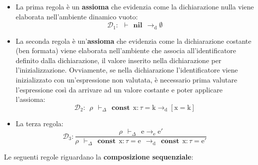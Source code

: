 \documentclass[a4paper]{article}
\begin{document}
	\begin{itemize}
		\item La prima regola è un \textbf{assioma} che evidenzia come la dichiarazione nulla viene elaborata nell'ambiente dinamico vuoto:
		\begin{equation*}
			\mathcal{D}_{1} : \:\: \vdash \:\: \mathbf{nil} \:\: \rightarrow_{\mathrm{d}} \emptyset
		\end{equation*}
	
		\item La seconda regola è un'\textbf{assioma} che evidenzia come la dichiarazione costante (ben formata) viene elaborata nell'ambiente che associa all'identificatore definito dalla dichiarazione, il valore inserito nella dichiarazione per l'inizializzazione.\newline
		Ovviamente, se nella dichiarazione l'identificatore viene inizializzato con un'espressione non valutata, è necessario prima valutare l'espressione così da arrivare ad un valore costante e poter applicare l'assioma:
		\begin{equation*}
			\mathcal{D}_{2}: \:\: \rho \:\: \vdash_{\Delta} \:\: \mathbf{const} \:\: \mathrm{x} : \tau = \mathrm{k} \rightarrow_{\mathrm{d}} \left[\mathrm{x} = \mathrm{k}\right]
		\end{equation*}
	
		\item La terza regola:
		\begin{equation*}
			\mathcal{D}_{3}: \dfrac{
				\rho \:\: \vdash_{\Delta} \:\: \mathrm{e} \rightarrow_{\mathrm{e}} \mathrm{e}'
			}{
				\rho \:\: \vdash_{\Delta} \:\: \mathbf{const} \:\: \mathrm{x} : \tau = \mathrm{e} \:\: \rightarrow_{\mathrm{d}} \:\: \mathbf{const} \:\: \mathrm{x} : \tau = \mathrm{e}'
			}
		\end{equation*}
	\end{itemize}
	Le seguenti regole riguardano la \textbf{composizione sequenziale}:
\end{document}
